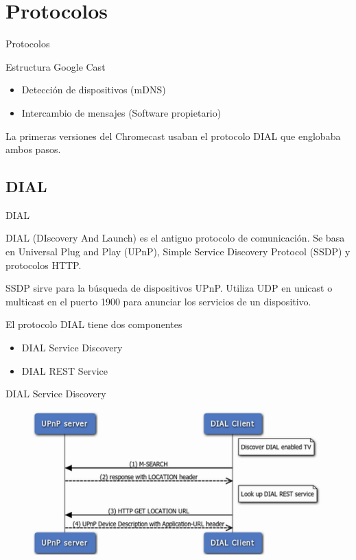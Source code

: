 \section{Protocolos}

\begin{frame}{Protocolos}
	\begin{block}{Estructura Google Cast}
		\begin{itemize}
			\item Detección de dispositivos (mDNS)
			\item Intercambio de mensajes (Software propietario)
		\end{itemize}
	\end{block}

	\begin{block}{ }
		La primeras versiones del Chromecast usaban el protocolo DIAL que englobaba ambos pasos.
	\end{block}
\end{frame}


\subsection{DIAL}
\begin{frame}{DIAL}
	\begin{block}{ }
		DIAL (DIscovery And Launch) es el antiguo protocolo de comunicación.
		Se basa en Universal Plug and Play (UPnP), Simple Service Discovery Protocol (SSDP) y protocolos HTTP.

		SSDP sirve para la búsqueda de dispositivos UPnP.
		Utiliza UDP en unicast o multicast en el puerto 1900 para anunciar los servicios de un dispositivo.
	\end{block}

	\begin{block}{ }
		El protocolo DIAL tiene dos componentes
		\begin{itemize}
			\item DIAL Service Discovery
			\item DIAL REST Service
		\end{itemize}
	\end{block}
\end{frame}



\begin{frame}{DIAL Service Discovery}
	\begin{figure}[H]
		\centering
		\includegraphics[width=1\textwidth]{./Imagenes/dial.png}
		\label{fig:DIAL}
	\end{figure}
\end{frame}

